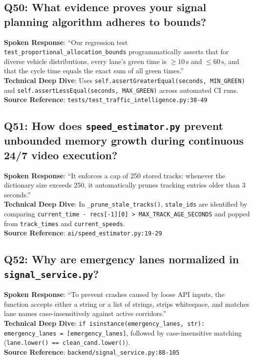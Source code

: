 \documentclass[11pt,a4paper,oneside]{report}
\begin{document}
\subsection*{Q50: What evidence proves your signal planning algorithm adheres to bounds?}
\begin{interviewbox}
\textbf{Spoken Response}: ``Our regression test \texttt{test\_proportional\_allocation\_bounds} programmatically asserts that for diverse vehicle distributions, every lane's green time is $\ge 10\,\text{s}$ and $\le 60\,\text{s}$, and that the cycle time equals the exact sum of all green times.''\\
\textbf{Technical Deep Dive}: Uses \texttt{self.assertGreaterEqual(seconds, MIN\_GREEN)} and \texttt{self.assertLessEqual(seconds, MAX\_GREEN)} across automated CI runs.\\
\textbf{Source Reference}: \texttt{tests/test\_traffic\_intelligence.py:38-49}
\end{interviewbox}

\subsection*{Q51: How does \texttt{speed\_estimator.py} prevent unbounded memory growth during continuous 24/7 video execution?}
\begin{interviewbox}
\textbf{Spoken Response}: ``It enforces a cap of 250 stored tracks: whenever the dictionary size exceeds 250, it automatically prunes tracking entries older than 3 seconds.''\\
\textbf{Technical Deep Dive}: In \texttt{\_prune\_stale\_tracks()}, \texttt{stale\_ids} are identified by comparing \texttt{current\_time - recs[-1][0] > MAX\_TRACK\_AGE\_SECONDS} and popped from \texttt{track\_times} and \texttt{current\_speeds}.\\
\textbf{Source Reference}: \texttt{ai/speed\_estimator.py:19-29}
\end{interviewbox}

\subsection*{Q52: Why are emergency lanes normalized in \texttt{signal\_service.py}?}
\begin{interviewbox}
\textbf{Spoken Response}: ``To prevent crashes caused by loose API inputs, the function accepts either a string or a list of strings, strips whitespace, and matches lane names case-insensitively against active corridors.''\\
\textbf{Technical Deep Dive}: \texttt{if isinstance(emergency\_lanes, str): emergency\_lanes = [emergency\_lanes]}, followed by case-insensitive matching (\texttt{lane.lower() == clean\_cand.lower()}).\\
\textbf{Source Reference}: \texttt{backend/signal\_service.py:88-105}
\end{interviewbox}
\end{document}
